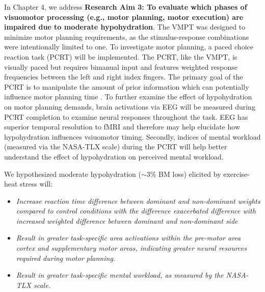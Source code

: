 In Chapter 4, we address \textbf{Research Aim 3: To evaluate which phases of visuomotor processing (e.g., motor planning, motor execution) are impaired due to moderate hypohydration}. The VMPT was designed to minimize motor planning requirements, as the stimulus-response combinations were intentionally limited to one. To investigate motor planning, a paced choice reaction task (PCRT) will be implemented. The PCRT, like the VMPT, is visually paced but requires bimanual input and features weighted response frequencies between the left and right index fingers. The primary goal of the PCRT is to manipulate the amount of prior information which can potentially influence motor planning time \cite{wong_motor_2015}. To further examine the effect of hypohydration on motor planning demands, brain activations via EEG will be measured during PCRT completion to examine neural responses throughout the task. EEG has superior temporal resolution to fMRI \cite{mehta_neuroergonomics:_2013} and therefore may help elucidate how hypohydration influences vsiuomotor timing. Secondly, indices of mental workload (measured via the NASA-TLX scale) during the PCRT will help better understand the effect of hypohydration on perceived mental workload.

We hypothesized moderate hypohydration (${\sim}$3\% BM loss) elicited by exercise-heat stress will:
        
\begin{itemize}
	\item \textit{Increase reaction time difference between dominant and non-dominant weights compared to control conditions with the difference exacerbated difference with increased weighted difference between dominant and non-dominant side}
	
	\item \textit{Result in greater task-specific area activations within the pre-motor area cortex and supplementary motor areas, indicating greater neural resources required during motor planning.}
	
	\item \textit{Result in greater task-specific mental workload, as measured by the NASA-TLX scale.}
\end{itemize}
